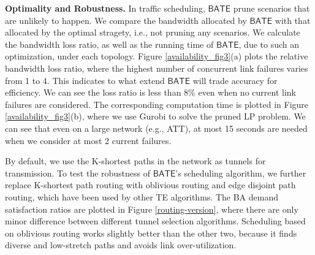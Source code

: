 \documentclass[sigconf]{acmart}
\begin{document}
\textbf{Optimality and Robustness.}
In traffic scheduling, $\mathsf{BATE}$ prune scenarios that are unlikely to happen.
We compare the bandwidth allocated by $\mathsf{BATE}$ with that allocated by the optimal stragety, i.e., not pruning any scenarios. 
We calculate the bandwidth loss ratio, as well as the running time of $\mathsf{BATE}$, due to such an optimization, under each topology.
Figure \ref{availability_fig3}(a) plots the relative bandwidth loss ratio,  
where the highest number of concurrent link failures varies from 1 to 4. 
This indicates to what extend $\mathsf{BATE}$ will trade accuracy for efficiency. 
We can see the loss ratio is less than 8\% even when no current link failures are considered.
The corresponding computation time is plotted in Figure \ref{availability_fig3}(b), 
where we use Gurobi \cite{gurobi} to solve the pruned LP problem. 
We can see that even on a large network (e.g., ATT), 
at most 15 seconds are needed when we consider at most 2 current failures.

By default, we use the K-shortest paths in the network as tunnels for transmission. 
To test the robustness of $\mathsf{BATE}$'s scheduling algorithm,
we further replace K-shortest path routing with oblivious routing\cite{SMORE} and  
edge disjoint path routing\cite{Bruno2013Dynamic}, which have been used by other TE algorithms.  
The BA demand satisfaction ratios are plotted in Figure \ref{routing-version}, 
where there are only minor difference between different tunnel selection algorithms.
Scheduling based on oblivious routing works slightly better than the other two, 
because it finds diverse and low-stretch paths and avoids link over-utilization.
\end{document}
